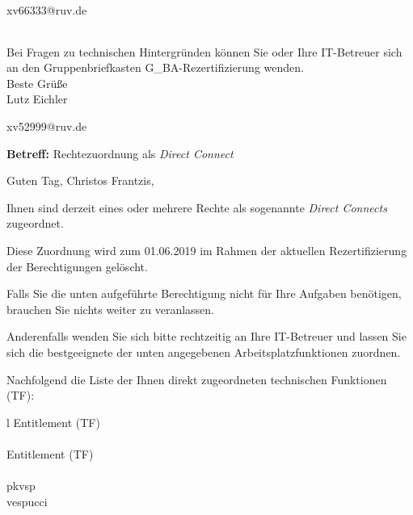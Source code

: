 \documentclass[a4paper,landscape,12pt]{letter}
\begin{document}
\begin{letter}{xv66333@ruv.de\hfill \break}
\begin{tiny}
\begin{longtable}{|p{35mm}|p{15mm}|p{25mm}|p{10mm}|p{40mm}|p{50mm}|p{50mm}|}
\hline
		\end{longtable}
		\end{tiny}
	
\begin{minipage}{\textwidth}
			Bei Fragen zu technischen Hintergründen können Sie 
			oder Ihre IT-Betreuer sich an den Gruppenbriefkasten 
			G\_BA-Rezertifizierung
			wenden.\\
			\linebreak
			Beste Grüße\\
			Lutz Eichler
	\end{minipage}
	\end{letter}
	
\begin{letter}{xv52999@ruv.de\hfill \break}
\begin{normalsize}
	\opening{\textbf{Betreff:} Rechtezuordnung als \emph{Direct Connect}}
	\begin{normalsize} \hfill
	\end{normalsize}

	\begin{normalsize}
		Guten Tag, 
	Christos Frantzis, \hfill \break
	\end{normalsize}
	\end{normalsize}
	
\begin{normalsize}
	Ihnen sind derzeit eines oder mehrere Rechte als sogenannte \emph{Direct Connects} zugeordnet.
	
	Diese Zuordnung wird zum 01.06.2019 im Rahmen der aktuellen Rezertifizierung der Berechtigungen gelöscht.
	
	Falls Sie die unten aufgeführte Berechtigung nicht für Ihre Aufgaben benötigen, 
	brauchen Sie nichts weiter zu veranlassen.
	
	Anderenfalls wenden Sie sich bitte rechtzeitig an Ihre IT-Betreuer 
	und lassen Sie sich die bestgeeignete der unten angegebenen Arbeitsplatzfunktionen zuordnen.
	\end{normalsize}
	
\begin{normalsize}
	Nachfolgend die Liste der Ihnen direkt zugeordneten technischen Funktionen (TF):

	\begin{longtable}{l}
		Entitlement (TF) \\ \hline
		\endfirsthead
		\\\hline
		Entitlement (TF) \\ \hline
		\endhead %
		\multicolumn{1}{r@{}}{Fortsetzung \ldots}\\
		\endfoot
		\hline
		\endlastfoot
	pkvsp\\vespucci\\
	\end{longtable}
	\end{normalsize}
	

\end{letter}
\end{document}
